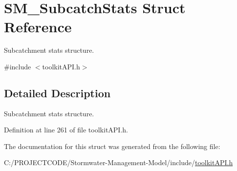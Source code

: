 \hypertarget{struct_s_m___subcatch_stats}{}\section{S\+M\+\_\+\+Subcatch\+Stats Struct Reference}
\label{struct_s_m___subcatch_stats}


Subcatchment stats structure.  




{\ttfamily \#include $<$toolkit\+A\+P\+I.\+h$>$}



\subsection{Detailed Description}
Subcatchment stats structure. 

Definition at line 261 of file toolkit\+A\+P\+I.\+h.



The documentation for this struct was generated from the following file\+:\begin{DoxyCompactItemize}
\item 
C\+:/\+P\+R\+O\+J\+E\+C\+T\+C\+O\+D\+E/\+Stormwater-\/\+Management-\/\+Model/include/\hyperlink{toolkit_a_p_i_8h}{toolkit\+A\+P\+I.\+h}\end{DoxyCompactItemize}
